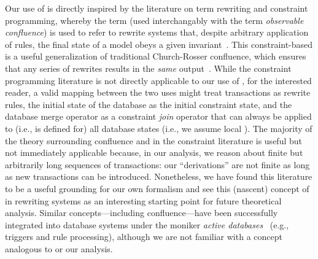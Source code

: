 Our use of \iconfluence is directly inspired by the literature on term
rewriting and constraint programming, whereby the term (used
interchangably with the term \textit{observable confluence}) is used
to refer to rewrite systems that, despite arbitrary application of
rules, the final state of a model obeys a given
invariant~\cite{obs-confluence}. This constraint-based \iconfluence is
a useful generalization of traditional Church-Rosser confluence, which
ensures that any series of rewrites results in the \textit{same}
output~\cite{termrewriting}. While the constraint programming
literature is not directly applicable to our use of \iconfluence, for
the interested reader, a valid mapping between the two uses might
treat transactions as rewrite rules, the initial state of the database
as the initial constraint state, and the database merge operator as a
constraint \textit{join} operator that can always be applied to (i.e.,
is defined for) all database states (i.e., we assume local
\iconfluence). The majority of the theory surrounding confluence and
\iconfluence in the constraint literature is useful but not
immediately applicable because, in our \cfreedom analysis, we reason
about finite but arbitrarily long sequences of transactions: our
``derivations'' are not finite as long as new transactions can be
introduced. Nonetheless, we have found this literature to be a useful
grounding for our own formalism and see this (nascent) concept of
\iconfluence in rewriting systems as an interesting starting point for
future theoretical analysis. Similar concepts---including
confluence---have been successfully integrated into database systems
under the moniker \textit{active databases}~\cite{activedb-book}
(e.g., triggers and rule processing), although we are not familiar
with a concept analogous to \iconfluence or our \cfreedom analysis.

